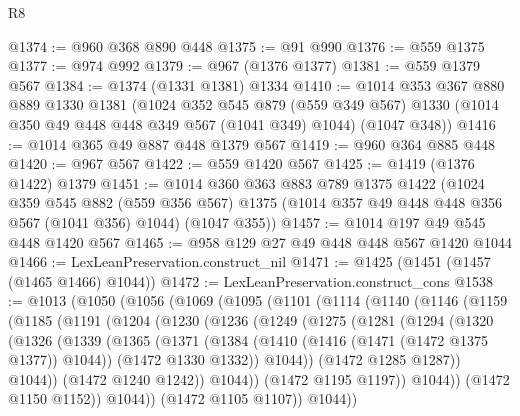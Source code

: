 \begin{lexlean}{R8}
\begin{coremodule}
@1374 := @960 @368 @890 @448
@1375 := @91 @990
@1376 := @559 @1375
@1377 := @974 @992
@1379 := @967 (@1376 @1377)
@1381 := @559 @1379 @567
@1384 := @1374 (@1331 @1381) @1334
@1410 := @1014
    @353
    @367
    @880
    @889
    @1330
    @1381
    (@1024
      @352
      @545
      @879
      (@559 @349 @567)
      @1330
      (@1014 @350 @49 @448 @448 @349 @567 (@1041 @349) @1044)
      (@1047 @348))
@1416 := @1014 @365 @49 @887 @448 @1379 @567
@1419 := @960 @364 @885 @448
@1420 := @967 @567
@1422 := @559 @1420 @567
@1425 := @1419 (@1376 @1422) @1379
@1451 := @1014
    @360
    @363
    @883
    @789
    @1375
    @1422
    (@1024
      @359
      @545
      @882
      (@559 @356 @567)
      @1375
      (@1014 @357 @49 @448 @448 @356 @567 (@1041 @356) @1044)
      (@1047 @355))
@1457 := @1014 @197 @49 @545 @448 @1420 @567
@1465 := @958 @129 @27 @49 @448 @448 @567 @1420 @1044
@1466 := LexLeanPreservation.construct_nil
@1471 := @1425 (@1451 (@1457 (@1465 @1466) @1044))
@1472 := LexLeanPreservation.construct_cons
@1538 := @1013
    (@1050
      (@1056
        (@1069
          (@1095
            (@1101
              (@1114
                (@1140
                  (@1146
                    (@1159
                      (@1185
                        (@1191
                          (@1204
                            (@1230
                              (@1236
                                (@1249
                                  (@1275
                                    (@1281
                                      (@1294
                                        (@1320
                                          (@1326
                                            (@1339
                                              (@1365
                                                (@1371
                                                  (@1384
                                                    (@1410
                                                      (@1416 (@1471 (@1472 @1375 @1377)) @1044))
                                                    (@1472 @1330 @1332))
                                                  @1044))
                                              (@1472 @1285 @1287))
                                            @1044))
                                        (@1472 @1240 @1242))
                                      @1044))
                                  (@1472 @1195 @1197))
                                @1044))
                            (@1472 @1150 @1152))
                          @1044))
                      (@1472 @1105 @1107))
                    @1044))

\end{coremodule}
\end{lexlean}
